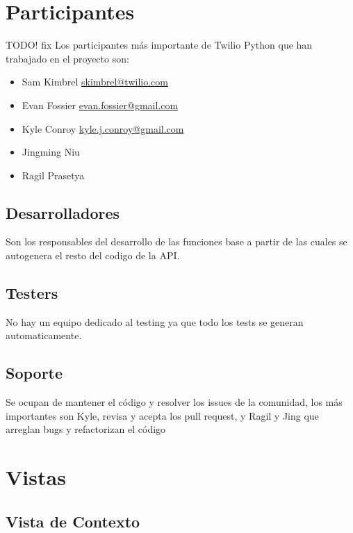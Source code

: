 \documentclass{article}
\begin{document}
\section{Participantes}
TODO! fix
Los participantes más importante de Twilio Python que han trabajado en el proyecto son:
\begin{itemize}
  \item Sam Kimbrel \href{mailto:skimbrel@twilio.com}{skimbrel@twilio.com}
  \item Evan Fossier \href{mailto:evan.fossier@gmail.com}{evan.fossier@gmail.com}
  \item Kyle Conroy \href{mailto:kyle.j.conroy@gmail.com}{kyle.j.conroy@gmail.com}
  \item Jingming Niu 
  \item Ragil Prasetya 
  
  \end{itemize}
  
  \subsection*{Desarrolladores}
  Son los responsables del desarrollo de las funciones base a partir de las cuales se autogenera el resto del codigo de la API.
  \subsection*{Testers}
  No hay un equipo dedicado al testing ya que todo los tests se generan automaticamente.
  \subsection*{Soporte}
  Se ocupan de mantener el código y resolver los issues de la comunidad, los más importantes son Kyle, revisa y acepta los pull request, y Ragil y Jing que  arreglan bugs y refactorizan el código

\section{Vistas}

\subsection{Vista de Contexto}

\hfill
\end{document}
